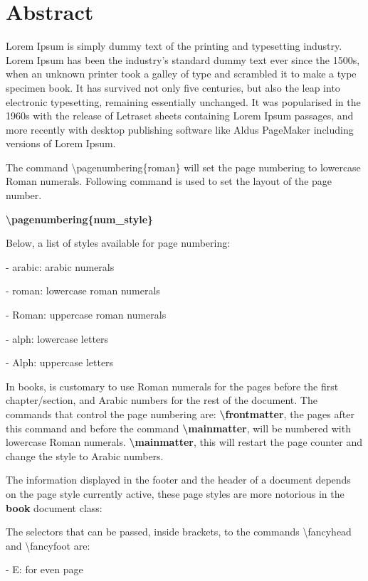 \documentclass[12pt,openright]{book}
\begin{document}
\chapter*{Abstract}

Lorem Ipsum is simply dummy text of the printing and typesetting industry. Lorem Ipsum has been the industry's standard dummy text ever since the 1500s, when an unknown printer took a galley of type and scrambled it to make a type specimen book. It has survived not only five centuries, but also the leap into electronic typesetting, remaining essentially unchanged. It was popularised in the 1960s with the release of Letraset sheets containing Lorem Ipsum passages, and more recently with desktop publishing software like Aldus PageMaker including versions of Lorem Ipsum.~\cite{Weir04}

The command \textbackslash pagenumbering\{roman\} will set the page numbering to lowercase Roman numerals. Following command is used to set the layout of the page number.

\textbf{\textbackslash pagenumbering\{num\_style\}}

Below, a list of styles available for page numbering:

- arabic: arabic numerals

- roman: lowercase roman numerals

- Roman: uppercase roman numerals

- alph: lowercase letters

- Alph: uppercase letters

In books, is customary to use Roman numerals for the pages before the first chapter/section, and Arabic numbers for the rest of the document. The commands that control the page numbering are: \textbf{\textbackslash frontmatter}, the pages after this command and before the command \textbf{\textbackslash mainmatter}, will be numbered with lowercase Roman numerals. \textbf{\textbackslash mainmatter}, this will restart the page counter and change the style to Arabic numbers.

The information displayed in the footer and the header of a document depends on the page style currently active, these page styles are more notorious in the \textbf{book} document class:

The selectors that can be passed, inside brackets, to the commands \textbackslash fancyhead and \textbackslash fancyfoot are:

- E: for even page
\end{document}

